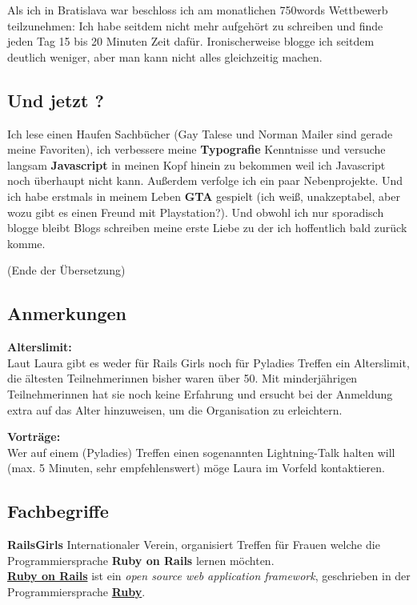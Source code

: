 Als ich in Bratislava war beschloss ich am monatlichen 750words Wettbewerb teilzunehmen: Ich habe seitdem nicht mehr aufgehört zu schreiben und finde jeden Tag 15 bis 20 Minuten Zeit dafür. Ironischerweise blogge ich seitdem deutlich weniger, aber man kann nicht alles gleichzeitig machen. 

\subsection*{Und jetzt ?}

Ich lese einen Haufen Sachbücher (Gay Talese und Norman Mailer sind gerade meine Favoriten), ich verbessere meine \textbf{Typografie} Kenntnisse und versuche langsam \textbf{Javascript} in meinen Kopf hinein zu bekommen weil ich Javascript noch überhaupt nicht kann. Außerdem verfolge ich ein paar Nebenprojekte. Und ich habe erstmals in meinem Leben \textbf{GTA} gespielt (ich weiß, unakzeptabel, aber wozu gibt es einen Freund mit Playstation?). Und obwohl ich nur sporadisch blogge bleibt Blogs schreiben meine erste Liebe zu der ich hoffentlich bald zurück komme. 

(Ende der Übersetzung)

\subsection*{Anmerkungen}
\textbf{Alterslimit:} \\
Laut Laura gibt es weder für Rails Girls noch für Pyladies Treffen ein Alterslimit, die ältesten Teilnehmerinnen bisher waren über 50. Mit minderjährigen  Teilnehmerinnen hat sie noch keine Erfahrung und ersucht bei der Anmeldung extra auf das Alter hinzuweisen, um die Organisation zu erleichtern.

\textbf{Vorträge:} \\
Wer auf einem (Pyladies) Treffen einen sogenannten Lightning-Talk halten will (max. 5 Minuten, sehr empfehlenswert) möge Laura im Vorfeld kontaktieren. 


\subsection*{Fachbegriffe}

\textbf{RailsGirls} Internationaler Verein, organisiert Treffen für Frauen welche die Programmiersprache \textbf{Ruby on Rails} lernen möchten. \\

\href{https://en.wikipedia.org/wiki/Ruby_on_rails}{\textbf{Ruby on Rails}} ist ein \textit{open source web application framework}, geschrieben in der Programmiersprache \href{ruby}{\textbf{Ruby}}. 

